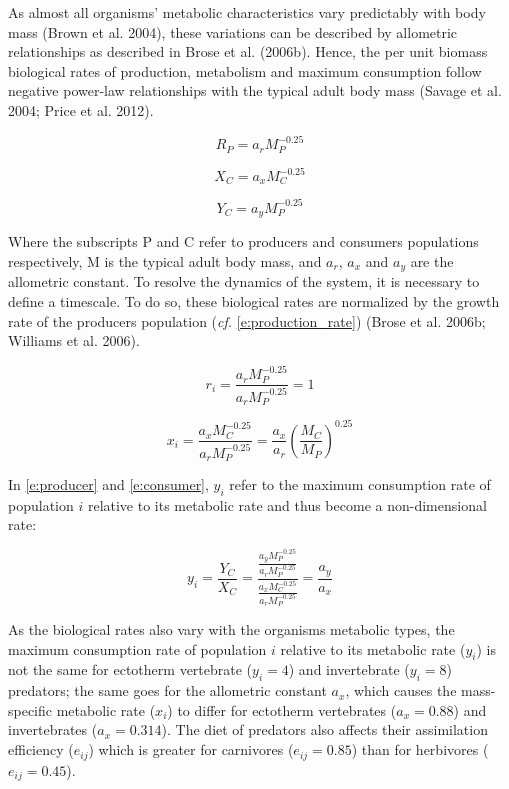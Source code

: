 \documentclass[12pt]{article}
\begin{document}
As almost all organisms' metabolic characteristics vary predictably with
body mass (Brown et al. 2004), these variations can be described by
allometric relationships as described in Brose et al. (2006b). Hence,
the per unit biomass biological rates of production, metabolism and
maximum consumption follow negative power-law relationships with the
typical adult body mass (Savage et al. 2004; Price et al. 2012).

\begin{equation}\label{e:production_rate}
R_P =  a_r M_P^{-0.25}
\end{equation}

\begin{equation}\label{e:metab_rate}
X_C =  a_x M_C^{-0.25}
\end{equation}

\begin{equation}\label{e:maxcons_rate}
Y_C =  a_y M_P^{-0.25}
\end{equation}

Where the subscripts P and C refer to producers and consumers
populations respectively, M is the typical adult body mass, and \(a_r\),
\(a_x\) and \(a_y\) are the allometric constant. To resolve the dynamics
of the system, it is necessary to define a timescale. To do so, these
biological rates are normalized by the growth rate of the producers
population (\emph{cf.} \autoref{e:production_rate}) (Brose et al. 2006b;
Williams et al. 2006).

\begin{equation}\label{e:norm_production_rate}
r_i =  \frac {a_r M_P^{-0.25}} {a_r M_P^{-0.25}} = 1
\end{equation}

\begin{equation}\label{e:norm_metab_rate}
x_i =  \frac {a_x M_C^{-0.25}} {a_r M_P^{-0.25}} = \frac {a_x} {a_r} (\frac {M_C} {M_P})^{0.25}
\end{equation}

In \autoref{e:producer} and \autoref{e:consumer}, \(y_{i}\) refer to the
maximum consumption rate of population \(i\) relative to its metabolic
rate and thus become a non-dimensional rate:

\begin{equation}\label{e:norm_maxcons_rate}
y_i = \frac {Y_C} {X_C} = \frac {\frac {a_y M_P^{-0.25}} {a_r M_P^{-0.25}}} { \frac{a_x M_C^{-0.25}} {a_r M_P^{-0.25}}} = \frac {a_y} {a_x}
\end{equation}

As the biological rates also vary with the organisms metabolic types,
the maximum consumption rate of population \(i\) relative to its
metabolic rate (\(y_{i}\)) is not the same for ectotherm vertebrate
(\(y_{i} = 4\)) and invertebrate (\(y_{i} = 8\)) predators; the same
goes for the allometric constant \(a_x\), which causes the mass-specific
metabolic rate (\(x_i\)) to differ for ectotherm vertebrates
(\(a_x = 0.88\)) and invertebrates (\(a_x = 0.314\)). The diet of
predators also affects their assimilation efficiency (\(e_{ij}\)) which
is greater for carnivores (\(e_{ij} = 0.85\)) than for herbivores
(\(e_{ij} = 0.45\)).
\end{document}
